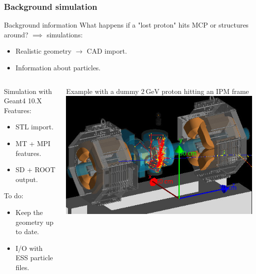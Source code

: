 \begin{frame}[t]
  \frametitle{Background simulation}
  \begin{block}{Background information}
    What happens if a "lost proton" hits MCP or structures around? $\implies$ simulations:
    \begin{itemize}
      \item Realistic geometry $\rightarrow$ CAD import.
      \item Information about particles.
    \end{itemize}
  \end{block}
  \begin{columns}[T]
    \begin{column}{0.45\textwidth}
      \begin{block}{Simulation with Geant4 10.X}
        Features:
        \begin{itemize}
          \item STL import.
          \item MT + MPI features.
          \item SD + ROOT output.
        \end{itemize}
        To do:
        \begin{itemize}
          \item Keep the geometry up to date.
          \item I/O with ESS particle files.
        \end{itemize}
      \end{block}
    \end{column}
    \begin{column}{0.45\textwidth}
      Example with a dummy $2\,\mathrm{GeV}$ proton hitting an IPM frame
      \includegraphics[width=1\textwidth]{05_Conclusion/fig/fig000_G4ESS2}
    \end{column}
  \end{columns}
\end{frame}

